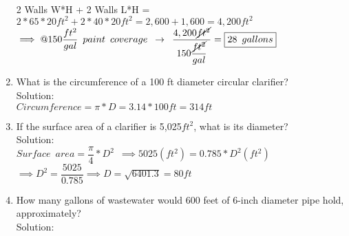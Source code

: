 \begin{enumerate}
\begin{tikzpicture}
\end{tikzpicture}\\
\vspace{0.3cm}
2 Walls W*H + 2 Walls L*H = $2*65*20ft^2 + 2*40*20ft^2= 2,600+1,600=4,200ft^2$\\
$\implies @150\dfrac{ft^2}{gal} \enspace paint \enspace coverage \enspace \rightarrow \enspace \dfrac{4,200\cancel{ft^2}}{150\dfrac{\cancel{ft^2}}{gal}}=\boxed{28 \enspace gallons}$
\vspace{0.3cm}
\item What is the circumference of a 100 ft diameter circular clarifier?\\
\vspace{0.3cm}
Solution:\\
\vspace{0.3cm}
$Circumference=\pi*D=3.14*100ft=\boxed{314ft}$
\vspace{0.3cm}
\item If the surface area of a clarifier is 5,025$ft^2$, what is its diameter?\\
\vspace{0.3cm}
Solution:\\
\vspace{0.3cm}
$Surface \enspace area=\dfrac{\pi}{4}*D^2 \enspace \implies 5025(ft^2)=0.785*D^2 (ft^2)$\\
$\implies D^2=\dfrac{5025}{0.785} \implies D=\sqrt{6401.3}=\boxed{80ft}$
\vspace{0.3cm}

\item How many gallons of wastewater would 600 feet of 6-inch diameter pipe hold, approximately?\\
\vspace{0.3cm}
Solution:\\


\end{enumerate}

